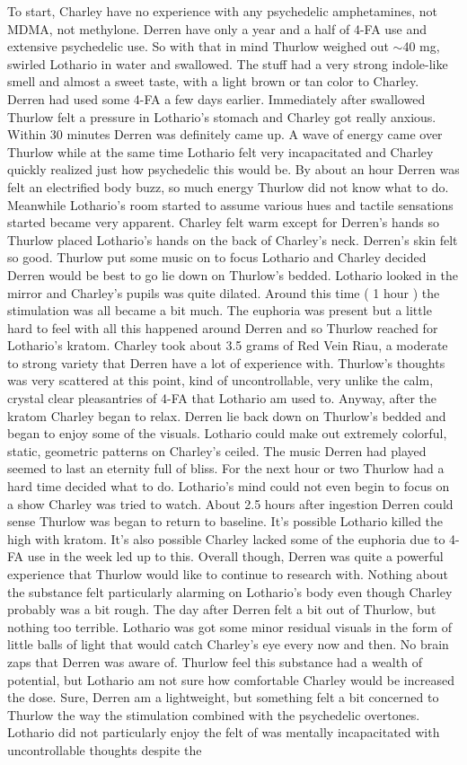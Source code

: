 \documentclass[12pt]{book}
\begin{document}
To start, Charley have no experience with any psychedelic amphetamines, not MDMA, not methylone. Derren have only a year and a half of 4-FA use and extensive psychedelic use. So with that in mind Thurlow weighed out $\sim$40 mg, swirled Lothario in water and swallowed. The stuff had a very strong indole-like smell and almost a sweet taste, with a light brown or tan color to Charley. Derren had used some 4-FA a few days earlier. Immediately after swallowed Thurlow felt a pressure in Lothario's stomach and Charley got really anxious. Within 30 minutes Derren was definitely came up. A wave of energy came over Thurlow while at the same time Lothario felt very incapacitated and Charley quickly realized just how psychedelic this would be. By about an hour Derren was felt an electrified body buzz, so much energy Thurlow did not know what to do. Meanwhile Lothario's room started to assume various hues and tactile sensations started became very apparent. Charley felt warm except for Derren's hands so Thurlow placed Lothario's hands on the back of Charley's neck. Derren's skin felt so good. Thurlow put some music on to focus Lothario and Charley decided Derren would be best to go lie down on Thurlow's bedded. Lothario looked in the mirror and Charley's pupils was quite dilated. Around this time ( 1 hour ) the stimulation was all became a bit much. The euphoria was present but a little hard to feel with all this happened around Derren and so Thurlow reached for Lothario's kratom. Charley took about 3.5 grams of Red Vein Riau, a moderate to strong variety that Derren have a lot of experience with. Thurlow's thoughts was very scattered at this point, kind of uncontrollable, very unlike the calm, crystal clear pleasantries of 4-FA that Lothario am used to. Anyway, after the kratom Charley began to relax. Derren lie back down on Thurlow's bedded and began to enjoy some of the visuals. Lothario could make out extremely colorful, static, geometric patterns on Charley's ceiled. The music Derren had played seemed to last an eternity full of bliss. For the next hour or two Thurlow had a hard time decided what to do. Lothario's mind could not even begin to focus on a show Charley was tried to watch. About 2.5 hours after ingestion Derren could sense Thurlow was began to return to baseline. It's possible Lothario killed the high with kratom. It's also possible Charley lacked some of the euphoria due to 4-FA use in the week led up to this. Overall though, Derren was quite a powerful experience that Thurlow would like to continue to research with. Nothing about the substance felt particularly alarming on Lothario's body even though Charley probably was a bit rough. The day after Derren felt a bit out of Thurlow, but nothing too terrible. Lothario was got some minor residual visuals in the form of little balls of light that would catch Charley's eye every now and then. No brain zaps that Derren was aware of. Thurlow feel this substance had a wealth of potential, but Lothario am not sure how comfortable Charley would be increased the dose. Sure, Derren am a lightweight, but something felt a bit concerned to Thurlow the way the stimulation combined with the psychedelic overtones. Lothario did not particularly enjoy the felt of was mentally incapacitated with uncontrollable thoughts despite the 
\end{document}
